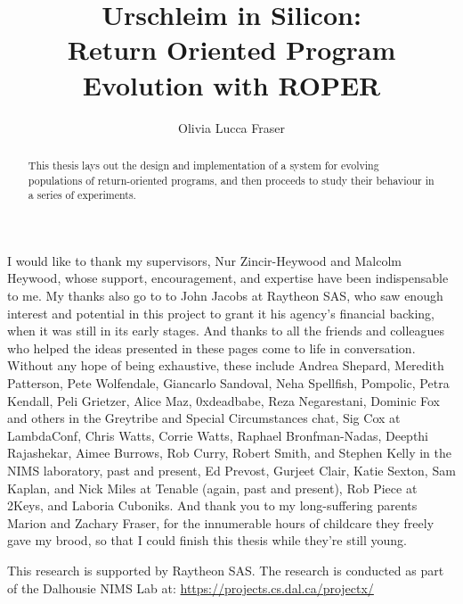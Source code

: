 \title{Urschleim in Silicon:\\Return Oriented Program\\Evolution with ROPER}
\author{Olivia Lucca Fraser}

\mcs
{}

\frontmatter

\begin{abstract}
  This thesis lays out the design and implementation of a system for
  evolving populations of return-oriented programs, and then proceeds to study their
  behaviour in a series of experiments. 
\end{abstract}

\begin{acknowledgements}
I would like to thank my supervisors, Nur Zincir-Heywood and Malcolm Heywood,
whose support, encouragement, and expertise have been indispensable to me. My
thanks also go to to John Jacobs at Raytheon SAS, who saw enough interest and
potential in this project to grant it his agency's financial backing, when it
was still in its early stages. And thanks to all the friends and colleagues who
helped the ideas presented in these pages come to life in conversation. Without
any hope of being exhaustive, these include Andrea Shepard, Meredith Patterson,
Pete Wolfendale, Giancarlo Sandoval, Neha Spellfish, Pompolic, Petra Kendall,
Peli Grietzer, Alice Maz, 0xdeadbabe, Reza Negarestani, Dominic Fox and others
in the Greytribe and Special Circumstances chat, Sig Cox at LambdaConf, Chris
Watts, Corrie Watts, Raphael Bronfman-Nadas, Deepthi Rajashekar, Aimee Burrows,
Rob Curry, Robert Smith, and Stephen Kelly in the NIMS laboratory, past and
present, Ed Prevost, Gurjeet Clair, Katie Sexton, Sam Kaplan, and Nick Miles at Tenable
(again, past and present), Rob Piece at 2Keys, and Laboria Cuboniks. And thank
you to my long-suffering parents Marion and Zachary Fraser, for the innumerable
hours of childcare they freely gave my brood, so that I could finish this thesis
while they're still young.

This research is supported by Raytheon SAS. The research is conducted
as part of the Dalhousie NIMS Lab at: \url{https://projects.cs.dal.ca/projectx/}
\end{acknowledgements}

\printnoidxglossaries
\clearpage
{}
\mainmatter